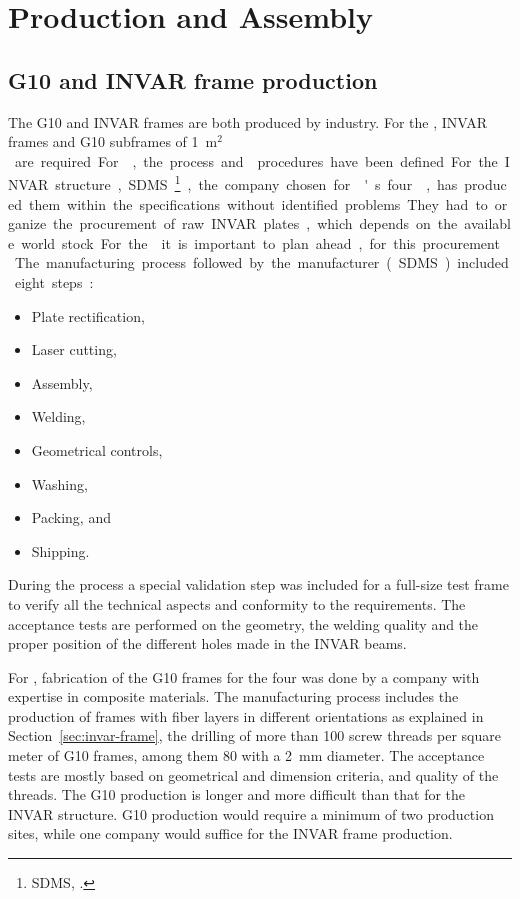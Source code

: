 \section{Production and Assembly}
\label{sec:fddp-crp-prod-assy}

\subsection{G10 and INVAR frame production}
\label{sec:fddp-crp-frame}

The G10 and INVAR frames are both produced by industry. For the , %
\dptotcrp INVAR frames and \dpnumpmtch %
G10 subframes of \SI{1}{m$^2$} are required. %
For , the process and  procedures have been defined.
For the INVAR structure, SDMS~\footnote{SDMS\texttrademark{}, \url{}.}, the company chosen for 's four ,  %
has produced them within the specifications without identified problems.
They had to organize the procurement of raw INVAR plates, which depends on the available world stock. For the  it is important to plan ahead, %
 for this procurement. 
The manufacturing process followed by the manufacturer (SDMS) included eight steps:\\
\begin{itemize}
\item Plate rectification,
\item  Laser cutting,
\item  Assembly,
\item  Welding,
\item  Geometrical controls,
\item  Washing,
\item  Packing, and
\item  Shipping.
\end{itemize}

During the process a special validation step was included  for a full-size test frame to verify all the technical aspects and conformity to the requirements. 
The acceptance tests are performed on the geometry, the welding quality and the proper position of the different holes made in the INVAR beams.

For , fabrication of the G10 frames for the four  was done by a company with expertise in composite materials. The manufacturing process includes the %
production of frames with fiber layers in different orientations as explained in Section~\ref{sec:invar-frame}, the drilling of more than \num{100} screw threads per square meter of G10 frames, among them \num{80} with a \SI{2}{mm} diameter.
The acceptance tests are mostly based on geometrical and dimension criteria, and quality of the threads.  
The G10 production is longer and more difficult than that for the INVAR structure. G10 production would require a minimum of two production sites, while one company would suffice for the INVAR frame production.

